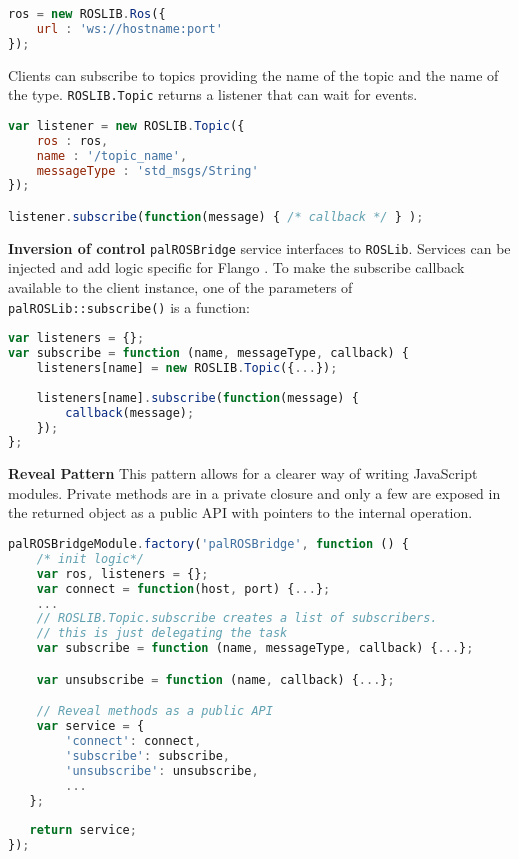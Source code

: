 \begin{lstlisting}[caption=ROSLibJS connect method, label=impl-flango-ros-roslib-connect, language=javascript]
ros = new ROSLIB.Ros({
    url : 'ws://hostname:port'
});
\end{lstlisting}

Clients can subscribe to topics providing the name of the topic and the name of the type.
\texttt{ROSLIB.Topic} returns a listener that can wait for events.

\begin{lstlisting}[caption=ROSLibJS subscribe method, label=impl-flango-ros-roslib-subscribe, language=javascript]
var listener = new ROSLIB.Topic({
    ros : ros,
    name : '/topic_name',
    messageType : 'std_msgs/String'
});

listener.subscribe(function(message) { /* callback */ } );
\end{lstlisting}

\textbf{Inversion of control} \texttt{palROSBridge} service interfaces to \texttt{ROSLib}.
Services can be injected and add logic specific for Flango \cm .
To make the subscribe callback available to the client instance, one of the parameters of \texttt{palROSLib::subscribe()} is a function:

\begin{lstlisting}[language=JavaScript, caption=palROSLib subscribe method, label=impl-flango-ros-palroslib-subscribe]
var listeners = {};
var subscribe = function (name, messageType, callback) {
    listeners[name] = new ROSLIB.Topic({...});
    
    listeners[name].subscribe(function(message) {
        callback(message);
    });
};
\end{lstlisting}

\textbf{Reveal Pattern} This pattern allows for a clearer way of writing JavaScript modules.
Private methods are in a private closure and only a few are exposed in the returned object as a public \ac{API} with pointers to the internal operation.

\begin{lstlisting}[language=JavaScript, caption=Reveal Pattern in palROSBridge, label=impl-flango-ros-palroslib-reveal]
palROSBridgeModule.factory('palROSBridge', function () {
    /* init logic*/
    var ros, listeners = {};
    var connect = function(host, port) {...};
    ...
    // ROSLIB.Topic.subscribe creates a list of subscribers.
    // this is just delegating the task
    var subscribe = function (name, messageType, callback) {...};

    var unsubscribe = function (name, callback) {...};

    // Reveal methods as a public API
    var service = {
        'connect': connect,
        'subscribe': subscribe,
        'unsubscribe': unsubscribe,
        ...
   };
   
   return service;
});
\end{lstlisting}
